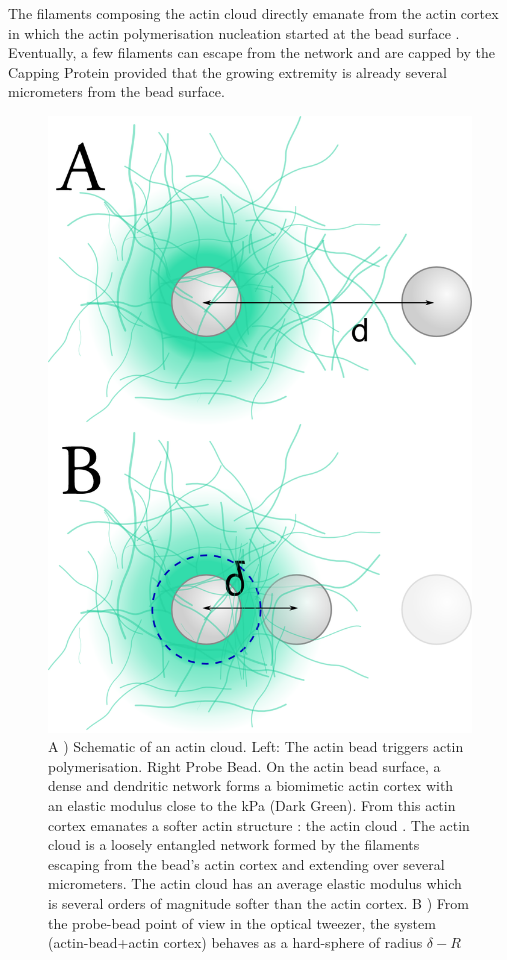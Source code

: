\documentclass[A4paperpaper,11pt,english]{sphinxmanual}
\begin{document}
The filaments composing the actin cloud directly emanate from the actin
cortex in which the actin polymerisation nucleation started at the bead surface
. Eventually, a few filaments can escape from the network and are
capped by the Capping Protein provided that the growing extremity is already several
micrometers from the bead surface.
\begin{figure}[htbp]
\centering
\capstart

\includegraphics[width=0.900\linewidth]{interp-delta.png}
\caption{A ) Schematic of an actin cloud. Left:  The actin bead triggers actin
polymerisation. Right Probe Bead. On the actin bead surface, a dense
and dendritic network forms a biomimetic actin cortex with an elastic
modulus close to the kPa (Dark Green). From this actin cortex emanates a
softer actin structure : the actin cloud . The actin cloud is a loosely
entangled network formed by the filaments escaping from the bead's actin
cortex and extending over several micrometers. The actin cloud has an average
elastic modulus which is several orders of magnitude softer than the actin
cortex. B ) From the probe-bead point of view in the optical tweezer, the
system (actin-bead+actin cortex) behaves as a hard-sphere of radius
\(\delta-R\)}\label{parts/part3:fig-interpretation}\end{figure}
\end{document}
